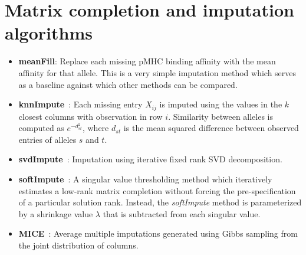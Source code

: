 
\section*{Matrix completion and imputation algorithms}

\begin{itemize}
\item {\bf meanFill}: Replace each missing pMHC binding affinity with the mean affinity for that allele. This is a very simple imputation method which serves as a baseline against which other methods can be compared. 

\item {\bf knnImpute}~\cite{Troyanskaya_2001}: Each missing entry $X_{ij}$ is imputed using the values in the $k$ closest columns with observation in row $i$.  Similarity between alleles is computed as $e^{-d_{st}^2}$, where $d_{st}$ is the mean squared difference between observed entries of alleles $s$ and $t$. 

\item {\bf svdImpute}~\cite{Troyanskaya_2001}: Imputation using iterative fixed rank SVD decomposition. 

\item {\bf softImpute}~\cite{Mazumder2010SpectralMatrices}: A singular value thresholding method which iteratively estimates a low-rank matrix completion without forcing the pre-specification of a particular solution rank. Instead, the {\it softImpute} method is parameterized by a shrinkage value $\lambda$ that is subtracted from each singular value. 

\item {\bf MICE}~\cite{Azur_2011}: Average multiple imputations generated using Gibbs sampling from the joint distribution of columns. 
\end{itemize}



